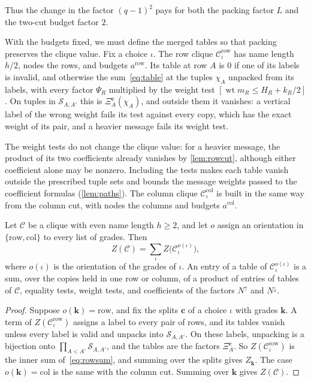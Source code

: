 \documentclass[11pt]{article}
\theoremstyle{definition}
\theoremstyle{definition}
\theoremstyle{remark}
\newcommand{\row}{\mathrm{row}}
\newcommand{\col}{\mathrm{col}}
\newcommand{\wt}{\operatorname{wt}}
\newcommand{\Nup}{N^{\uparrow}}
\newcommand{\Ndown}{N^{\downarrow}}
\begin{document}
Thus the change in the factor $(q-1)^2$ pays for both the packing factor $L$ and the two-cut budget factor $2$.

With the budgets fixed, we must define the merged tables so that packing preserves the clique value. Fix a choice $\iota$. The row clique $\mathcal C^\row_\iota$ has name length $h/2$, nodes the rows, and budgets $a^\row$. Its table at row $A$ is $0$ if one of its labels is invalid, and otherwise the sum~\eqref{eq:table} at the tuples $\chi_A$ unpacked from its labels, with every factor $\Psi_R$ multiplied by the weight test $[\wt m_R\le H_R+k_R/2]$. On tuples in $\mathcal S_{A,A'}$ this is $\Xi^{\mathbf c}_A(\chi_A)$, and outside them it vanishes: a vertical label of the wrong weight fails its test against every copy, which has the exact weight of its pair, and a heavier message fails its weight test.

The weight tests do not change the clique value: for a heavier message, the product of its two coefficients already vanishes by \cref{lem:rowcut}, although either coefficient alone may be nonzero. Including the tests makes each table vanish outside the prescribed tuple sets and bounds the message weights passed to the coefficient formulas (\cref{lem:paths}). The column clique $\mathcal C^\col_\iota$ is built in the same way from the column cut, with nodes the columns and budgets $a^\col$.

\begin{lemma}\label{lem:merge}
Let $\mathcal C$ be a clique with even name length $h\ge2$, and let $o$ assign an orientation in $\{\row,\col\}$ to every list of grades. Then
\[
Z(\mathcal C)=\sum_\iota Z\bigl(\mathcal C^{o(\iota)}_\iota\bigr),
\]
where $o(\iota)$ is the orientation of the grades of $\iota$. An entry of a table of $\mathcal C^{o(\iota)}_\iota$ is a sum, over the copies held in one row or column, of a product of entries of tables of $\mathcal C$, equality tests, weight tests, and coefficients of the factors $\Nup$ and $\Ndown$.
\end{lemma}

\begin{proof}
Suppose $o(\mathbf k)=\row$, and fix the splits $\mathbf c$ of a choice $\iota$ with grades $\mathbf k$. A term of $Z(\mathcal C^\row_\iota)$ assigns a label to every pair of rows, and its tables vanish unless every label is valid and unpacks into $\mathcal S_{A,A'}$. On these labels, unpacking is a bijection onto $\prod_{A<A'}\mathcal S_{A,A'}$, and the tables are the factors $\Xi^{\mathbf c}_A$. So $Z(\mathcal C^\row_\iota)$ is the inner sum of~\eqref{eq:rowsum}, and summing over the splits gives $Z_{\mathbf k}$. The case $o(\mathbf k)=\col$ is the same with the column cut. Summing over $\mathbf k$ gives $Z(\mathcal C)$.
\end{proof}
\end{document}

